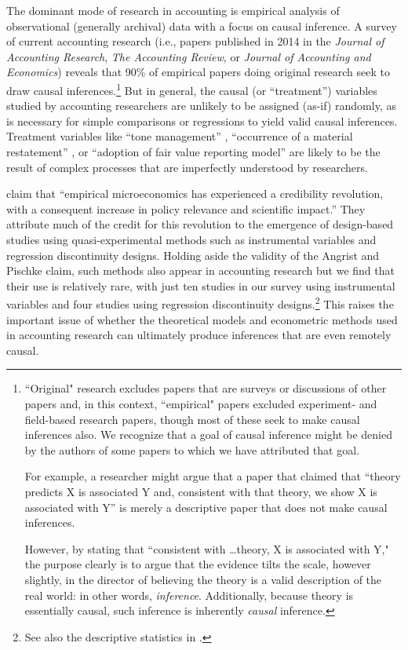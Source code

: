\documentclass[11pt]{amsart}
\begin{document}

The dominant mode of research in accounting is empirical analysis of observational (generally archival) data with a focus on causal inference.
A survey of current accounting research (i.e., papers published in 2014 in the \textit{Journal of Accounting Research}, \textit{The Accounting Review}, or \textit{Journal of Accounting and Economics}) reveals that 90\% of empirical papers doing original research seek to draw causal inferences.\footnote{``Original" research excludes papers that are surveys or discussions of other papers and, in this context, ``empirical" papers excluded experiment- and field-based research papers, though most of these seek to make causal inferences also. 
We recognize that a goal of causal inference might be denied by the authors of some papers to which we have attributed that goal.

For example, a researcher might argue that a paper that claimed that ``theory predicts X is associated Y and, consistent with that theory, we show X is associated with Y'' is merely a descriptive paper that does not make causal inferences. 

However, by stating that ``consistent with \dots theory, X is associated with Y," the purpose clearly is to argue that the evidence tilts the scale, however slightly, in the director of believing the theory is a valid description of the real world: in other words, \emph{inference}. 
Additionally, because theory is essentially causal, such inference is inherently \emph{causal} inference.} 
But in general, the causal (or ``treatment'') variables studied by accounting researchers are unlikely to be assigned (as-if) randomly, as is necessary for simple comparisons or regressions to yield valid causal inferences.
Treatment variables like ``tone management'' \citep{Huang:2014cs}, ``occurrence of a material restatement'' \citep{Chen:2014ji}, or ``adoption of fair value reporting model'' \citep{Liang:2014ea} are likely to be the result of complex processes that are imperfectly understood by researchers.

\cite{Angrist:2010jv} claim that ``empirical microeconomics has experienced a credibility revolution, with a consequent increase in policy relevance and scientific impact.''
They attribute much of the credit for this revolution to the emergence of design-based studies using quasi-experimental methods such as instrumental variables and regression discontinuity designs.
Holding aside the validity of the Angrist and Pischke claim, such methods also appear in accounting research but we find that their use is relatively rare, with just ten studies in our survey using instrumental variables and four studies using regression discontinuity designs.\footnote{See also the descriptive statistics in \citep{Larcker:2010fq}.}  This raises the important issue of whether the theoretical models and econometric methods used in accounting research can ultimately produce inferences that are even remotely causal.
\end{document}
